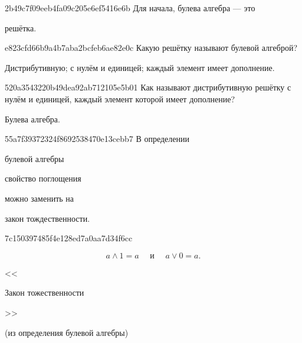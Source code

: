 \begin{note}{2b49c7f09eeb4fa09c205e6ef5416e6b}
    Для начала, булева алгебра --- это \begin{icloze}{1}решётка.\end{icloze}
\end{note}

\begin{note}{e823cfd66b9a4b7aba2bcfeb6ae82e0c}
    Какую решётку называют булевой алгеброй?

    \begin{cloze}{1}
        Дистрибутивную; с нулём и единицей; каждый элемент имеет дополнение.
    \end{cloze}
\end{note}

\begin{note}{520a3543220b49dea92ab712105e5b01}
    Как называют дистрибутивную решётку с нулём и единицей, каждый элемент которой имеет дополнение?

    \begin{cloze}{1}
        Булева алгебра.
    \end{cloze}
\end{note}

\begin{note}{55a7f39372324f8692538470e13cebb7}
    В определении \begin{icloze}{3}булевой алгебры\end{icloze} \begin{icloze}{2}свойство поглощения\end{icloze} можно заменить на \begin{icloze}{1}закон тождественности.\end{icloze}
\end{note}

\begin{note}{7c150397485f4e128ed7a0aa7d34f6cc}
    \begin{icloze}{1}
        \[
            a \land 1 = a \quad \text{ и } \quad a \lor 0 = a.
        \]
    \end{icloze}

    \begin{center}
        \tiny
        <<\begin{icloze}{2}Закон тожественности\end{icloze}>>

        (из определения булевой алгебры)
    \end{center}
\end{note}

